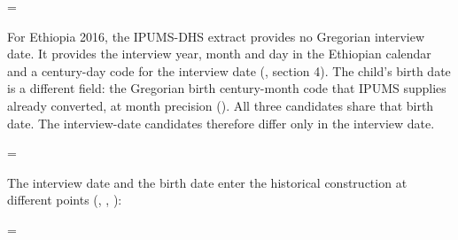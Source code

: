 \begingroup\edef\ThesisSavedIndent{\the\parindent}\raggedright\parindent=\ThesisSavedIndent\relax{}

For Ethiopia 2016, the IPUMS-DHS extract provides no Gregorian interview date. It provides the interview year, month and day in the Ethiopian calendar and a century-day code for the interview date (, section 4). The child's birth date is a different field: the Gregorian birth century-month code that IPUMS supplies already converted, at month precision (). All three candidates share that birth date. The interview-date candidates therefore differ only in the interview date.

\par\endgroup

\begingroup\edef\ThesisSavedIndent{\the\parindent}\raggedright\parindent=\ThesisSavedIndent\relax{}

The interview date and the birth date enter the historical construction at different points (, , ):

\par\endgroup

\begingroup\edef\ThesisSavedIndent{\the\parindent}\raggedright\parindent=\ThesisSavedIndent\relax{}


